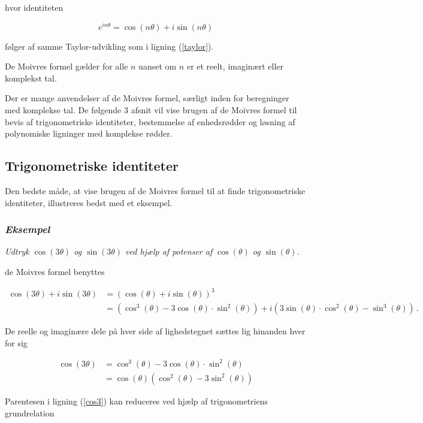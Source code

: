 \documentclass[a4paper, 12pt,titlepage]{article}
\begin{document}
hvor identiteten

$$e^{i n \theta}=\cos(n\theta) + i \sin(n\theta)$$ 

følger af samme Taylor-udvikling som i ligning (\ref{taylor}).

De Moivres formel gælder for alle \(n\) uanset om \(n\) er et reelt, imaginært eller komplekst tal. 

Der er mange anvendelser af de Moivres formel, særligt inden for beregninger med komplekse tal. De følgende 3 afsnit vil vise brugen af de Moivres formel til bevis af trigonometriske identiteter, bestemmelse af enhedsrødder og løsning af polynomiske ligninger med komplekse rødder.

\subsection{Trigonometriske identiteter}
\label{sec:org53281b8}

Den bedste måde, at vise brugen af de Moivres formel til at finde trigonometriske identiteter, illustreres bedst med et eksempel.

\subsubsection*{\emph{Eksempel}}
\label{sec:org1c74004}
\emph{Udtryk \(\cos (3 \theta)\) og \(\sin (3 \theta )\) ved hjælp af potenser af \(\cos(\theta)\) og \(\sin(\theta)\).}

de Moivres formel benyttes

\begin{align}
    \cos (3 \theta) + i \sin(3 \theta) &= \left( \cos(\theta) + i \sin(\theta) \right)^3 \nonumber\\
                    &= \left( \cos^3(\theta) - 3 \cos(\theta)\cdot \sin^2(\theta) \right) + i\left( 3 \sin(\theta) \cdot \cos^2(\theta) -\sin^3(\theta) \right)\,.
\end{align}

De reelle og imaginære dele på hver side af lighedstegnet sættes lig hinanden hver for sig

\begin{align}
\label{cos3}
    \cos(3 \theta) &= \cos^3(\theta) - 3 \cos(\theta) \cdot \sin^2(\theta) \nonumber\\
                   &= \cos(\theta) \left( \cos^2(\theta) -3 \sin^2(\theta)\right)
\end{align}

Parentesen i ligning (\ref{cos3}) kan reduceres ved hjælp af trigonometriens grundrelation
\end{document}
